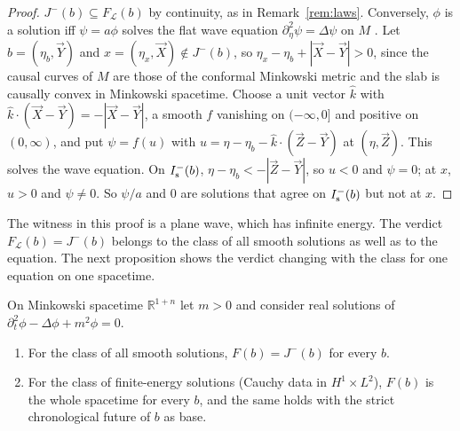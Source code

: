 \begin{proof}
$J^-(b)\subseteq F_{\mathcal L}(b)$ by continuity, as in
Remark~\ref{rem:laws}. Conversely, $\phi$ is a solution iff $\psi=a\phi$
solves the flat wave equation $\partial_\eta^2\psi=\Delta\psi$ on $M$
\citep[app.~D]{Wald1984}. Let $b=(\eta_b,\vec Y)$ and $x=(\eta_x,\vec X)\notin
J^-(b)$, so $\eta_x-\eta_b+|\vec X-\vec Y|>0$, since the causal curves of $M$
are those of the conformal Minkowski metric and the slab is causally convex in
Minkowski spacetime. Choose a unit vector $\hat k$
with $\hat k\cdot(\vec X-\vec Y)=-|\vec X-\vec Y|$, a smooth $f$ vanishing on
$(-\infty,0]$ and positive on $(0,\infty)$, and put $\psi=f(u)$ with
$u=\eta-\eta_b-\hat k\cdot(\vec Z-\vec Y)$ at $(\eta,\vec Z)$. This solves the
wave equation. On $I^-_{\mathrm s}(b)$, $\eta-\eta_b<-|\vec Z-\vec Y|$, so $u<0$ and
$\psi=0$; at $x$, $u>0$ and $\psi\neq0$. So $\psi/a$ and $0$ are solutions that
agree on $I^-_{\mathrm s}(b)$ but not at $x$.
\end{proof}

\begin{remark}\label{rem:class}
The witness in this proof is a plane wave, which has infinite energy. The verdict
$F_{\mathcal L}(b)=J^-(b)$ belongs to the class of all smooth solutions as well as
to the equation. The next proposition shows the verdict changing with the class
for one equation on one spacetime.
\end{remark}

\begin{proposition}\label{prop:massmink}
On Minkowski spacetime $\mathbb R^{1+n}$ let $m>0$ and consider real solutions
of $\partial_t^2\phi-\Delta\phi+m^2\phi=0$.
\begin{enumerate}
\item[(a)] For the class of all smooth solutions, $F(b)=J^-(b)$ for every $b$.
\item[(b)] For the class of finite-energy solutions (Cauchy data in
$H^1\times L^2$), $F(b)$ is the whole spacetime for every $b$, and the same holds
with the strict chronological future of $b$ as base.
\end{enumerate}
\end{proposition}

